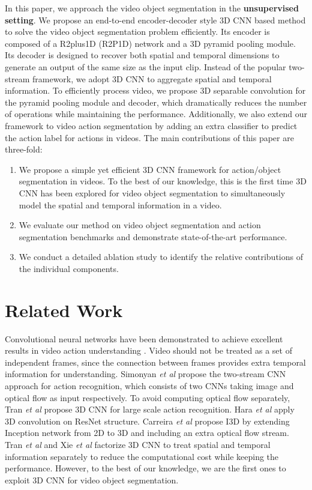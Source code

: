 \documentclass{bmvc2k}
\def\etal{\emph{et al}\bmvaOneDot}
\begin{document}
In this paper, we approach the video object segmentation in the \textbf{unsupervised setting}. We propose an end-to-end encoder-decoder style 3D CNN based method to solve the video object segmentation problem efficiently. Its encoder is composed of a R2plus1D (R2P1D) network \cite{r2plus1d_cvpr18} and a 3D pyramid pooling module. Its decoder is designed to recover both spatial and temporal dimensions to generate an output of the same size as the input clip. Instead of the popular two-stream framework, we adopt 3D CNN to aggregate spatial and temporal information. To efficiently process video, we propose 3D separable convolution for the pyramid pooling module and decoder, which dramatically reduces the number of operations while maintaining the performance. Additionally, we also extend our framework to video action segmentation by adding an extra classifier to predict the action label for actions in videos.
The main contributions of this paper are three-fold:
\begin{enumerate}\item We propose a simple yet efficient 3D CNN framework for action/object segmentation in videos. To the best of our knowledge, this is the first time 3D CNN has been explored for video object segmentation to simultaneously model the spatial and temporal information in a video.
\item We evaluate our method on video object segmentation and action segmentation benchmarks and demonstrate state-of-the-art performance.
\item We conduct a detailed ablation study to identify the relative contributions of the individual components.
\end{enumerate}

\section{Related Work}
\label{sec:related_work}
Convolutional neural networks have been demonstrated to achieve excellent results in video action understanding \cite{lecun2015deep, karpathy2014large, lstm_ng}. Video should not be treated as a set of independent frames, since the connection between frames provides extra temporal information for understanding. Simonyan \etal \cite{2stream_cnn_simonyan_2014two} propose the two-stream CNN approach for action recognition, which consists of two CNNs taking image and optical flow as input respectively. To avoid computing optical flow separately, Tran \etal \cite{c3d} propose 3D CNN for large scale action recognition. Hara \etal \cite{hara2018can} apply 3D convolution on ResNet structure. Carreira \etal \cite{carreira2017quo} propose I3D by extending Inception network from 2D to 3D and including an extra optical flow stream. Tran \etal \cite{r2plus1d_cvpr18} and Xie \etal \cite{xie2018rethinking} factorize 3D CNN to treat spatial and temporal information separately to reduce the computational cost while keeping the performance. However, to the best of our knowledge, we are the first ones to exploit 3D CNN for video object segmentation.
\end{document}
